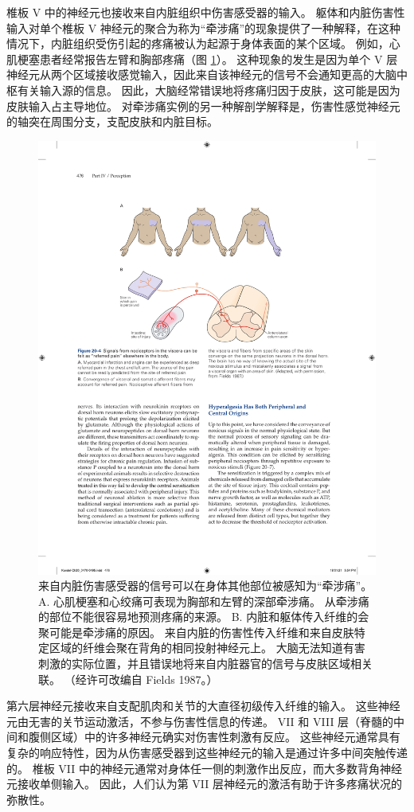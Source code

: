 椎板 V 中的神经元也接收来自内脏组织中伤害感受器的输入。 
躯体和内脏伤害性输入对单个椎板 V 神经元的聚合为称为“牵涉痛”的现象提供了一种解释，在这种情况下，内脏组织受伤引起的疼痛被认为起源于身体表面的某个区域。 
例如，心肌梗塞患者经常报告左臂和胸部疼痛（图 \ref{fig:20_4}）。 
这种现象的发生是因为单个 V 层神经元从两个区域接收感觉输入，因此来自该神经元的信号不会通知更高的大脑中枢有关输入源的信息。 
因此，大脑经常错误地将疼痛归因于皮肤，这可能是因为皮肤输入占主导地位。 
对牵涉痛实例的另一种解剖学解释是，伤害性感觉神经元的轴突在周围分支，支配皮肤和内脏目标。


\begin{figure}[htbp]
	\centering
	\includegraphics[width=0.7\linewidth]{chap20/fig_20_4}
	\caption{来自内脏伤害感受器的信号可以在身体其他部位被感知为“牵涉痛”。 
		A. 心肌梗塞和心绞痛可表现为胸部和左臂的深部牵涉痛。 
		从牵涉痛的部位不能很容易地预测疼痛的来源。 
		B. 内脏和躯体传入纤维的会聚可能是牵涉痛的原因。 
		来自内脏的伤害性传入纤维和来自皮肤特定区域的纤维会聚在背角的相同投射神经元上。 
		大脑无法知道有害刺激的实际位置，并且错误地将来自内脏器官的信号与皮肤区域相关联。 （经许可改编自 Fields 1987。）}
	\label{fig:20_4}
\end{figure}

第六层神经元接收来自支配肌肉和关节的大直径初级传入纤维的输入。 
这些神经元由无害的关节运动激活，不参与伤害性信息的传递。 
VII 和 VIII 层（脊髓的中间和腹侧区域）中的许多神经元确实对伤害性刺激有反应。 
这些神经元通常具有复杂的响应特性，因为从伤害感受器到这些神经元的输入是通过许多中间突触传递的。 
椎板 VII 中的神经元通常对身体任一侧的刺激作出反应，而大多数背角神经元接收单侧输入。 
因此，人们认为第 VII 层神经元的激活有助于许多疼痛状况的弥散性。


